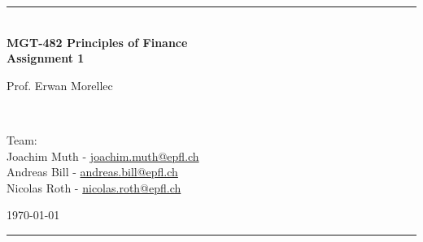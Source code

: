 \documentclass[a4paper,11pt,twoside]{article}
\newcommand{\mail}[1]{{\href{mailto:#1}{#1}}}
\begin{document}
\begin{titlepage} %
\begin{center}
\newcommand{\HRule}{\rule{\linewidth}{0.5mm}} %
\center %
 
 




\begin{figure} [h] %
\centerline{
} 
\end{figure}

\HRule \\[0.4cm]
{ \huge \bfseries MGT-482 Principles of Finance \\Assignment 1}\\[0.4cm] %

\begin{minipage}[t]{0.4\textwidth}
\flushleft
Prof. Erwan Morellec
\end{minipage}
~
\begin{minipage}[t]{0.55\textwidth}
\flushright
Team: \\
Joachim Muth - \mail{joachim.muth@epfl.ch}\\
Andreas Bill - \mail{andreas.bill@epfl.ch}\\
Nicolas Roth - \mail{nicolas.roth@epfl.ch}\\
\end{minipage}
\begin{center}
\today
\end{center}
\HRule \\

\end{center}
\end{titlepage}



\pagestyle{fancy}
\end{document}
